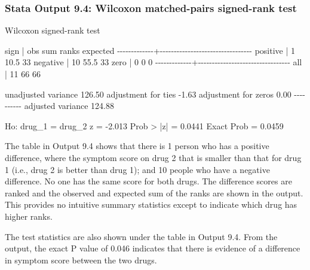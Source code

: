 \documentclass[
]{memoir}
\newenvironment{Shaded}{\begin{snugshade}}{\end{snugshade}}
\newcommand{\NormalTok}[1]{#1}
\begin{document}
\hypertarget{stata-output-9.4-wilcoxon-matched-pairs-signed-rank-test}{%
\subsubsection*{Stata Output 9.4: Wilcoxon matched-pairs signed-rank test}\label{stata-output-9.4-wilcoxon-matched-pairs-signed-rank-test}}

\begin{Shaded}
\begin{Highlighting}[]
\NormalTok{Wilcoxon signed{-}rank test}

\NormalTok{        sign |      obs   sum ranks    expected}
\NormalTok{{-}{-}{-}{-}{-}{-}{-}{-}{-}{-}{-}{-}{-}+{-}{-}{-}{-}{-}{-}{-}{-}{-}{-}{-}{-}{-}{-}{-}{-}{-}{-}{-}{-}{-}{-}{-}{-}{-}{-}{-}{-}{-}{-}{-}{-}{-}}
\NormalTok{    positive |        1        10.5          33}
\NormalTok{    negative |       10        55.5          33}
\NormalTok{        zero |        0           0           0}
\NormalTok{{-}{-}{-}{-}{-}{-}{-}{-}{-}{-}{-}{-}{-}+{-}{-}{-}{-}{-}{-}{-}{-}{-}{-}{-}{-}{-}{-}{-}{-}{-}{-}{-}{-}{-}{-}{-}{-}{-}{-}{-}{-}{-}{-}{-}{-}{-}}
\NormalTok{         all |       11          66          66}

\NormalTok{unadjusted variance      126.50}
\NormalTok{adjustment for ties       {-}1.63}
\NormalTok{adjustment for zeros       0.00}
\NormalTok{                     {-}{-}{-}{-}{-}{-}{-}{-}{-}{-}}
\NormalTok{adjusted variance        124.88}

\NormalTok{Ho: drug\_1 = drug\_2}
\NormalTok{             z =  {-}2.013}
\NormalTok{    Prob \textgreater{} |z| =   0.0441}
\NormalTok{    Exact Prob =   0.0459}
\end{Highlighting}
\end{Shaded}

The table in Output 9.4 shows that there is 1 person who has a positive difference, where the symptom score on drug 2 that is smaller than that for drug 1 (i.e., drug 2 is better than drug 1); and 10 people who have a negative difference. No one has the same score for both drugs. The difference scores are ranked and the observed and expected sum of the ranks are shown in the output. This provides no intuitive summary statistics except to indicate which drug has higher ranks.

The test statistics are also shown under the table in Output 9.4. From the output, the exact P value of 0.046 indicates that there is evidence of a difference in symptom score between the two drugs.
\end{document}
